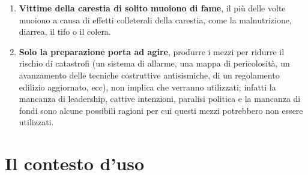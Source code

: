 \begin{enumerate}
\item\textbf{Vittime della carestia di solito muoiono di fame}, il più delle volte muoiono a causa di effetti colleterali della carestia, come la malnutrizione, diarrea, il tifo o il colera.
\item\textbf{Solo la preparazione porta ad agire}, produrre i mezzi per ridurre il rischio di catastrofi (un sistema di allarme, una mappa di pericolosità, un avanzamento delle tecniche costruttive antisismiche, di un regolamento edilizio aggiornato, ecc), non implica che verranno utilizzati; infatti la mancanza di leadership, cattive intenzioni, paralisi politica e la mancanza di fondi sono alcune possibili ragioni per cui questi mezzi potrebbero non essere utilizzati.

\end{enumerate}
\newpage

\section{Il contesto d'uso}
\label{contesto}

